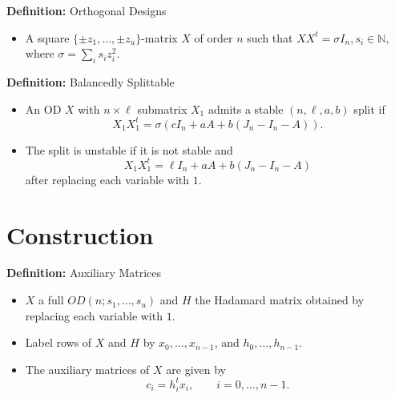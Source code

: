 \documentclass{beamer}
\begin{document}
\begin{frame}

  \begin{block}{{\bf Definition:} Orthogonal Designs}
    \begin{itemize}
    \item A square $\{\pm z_1, \dots, \pm z_u\}$-matrix $X$ of order $n$ such
      that
      $
      XX^t = \sigma I_n, s_i \in \mathbb{N},
      $
      where $\sigma = \sum_i s_iz_i^2$.
    \end{itemize}
  \end{block}

  \pause

  \begin{block}{{\bf Definition:} Balancedly Splittable \cite[][]{split-od}} 
    \begin{itemize}
    \item An OD $X$ with $n \times \ell$ submatrix $X_1$ admits a stable
      $(n,\ell,a,b)$ split if
        $$
        X_1X_1^t = \sigma(cI_n + aA + b(J_n-I_n-A)).
        $$
      \item The split is unstable if it is not stable and
        $$
        X_1X_1^t = \ell I_n + aA + b(J_n-I_n-A)
        $$
        after replacing each variable with $1$.
    \end{itemize}
  \end{block}

\end{frame}


\section{Construction}

\begin{frame}

  \begin{block}{{\bf Definition:} Auxiliary Matrices}
    \begin{itemize}
      \item $X$ a full $OD(n;s_1, \dots, s_u)$ and $H$ the Hadamard matrix
        obtained by replacing each variable with $1$.
      \item Label rows of $X$ and $H$ by $x_0, \dots, x_{n-1}$, and
        $h_0, \dots, h_{n-1}$.
      \item The auxiliary matrices of $X$ are given by
        $$
        c_i = h_i^tx_i, \qquad i = 0, \dots, n-1. 
        $$
    \end{itemize}
  \end{block}

\end{frame}
\end{document}
